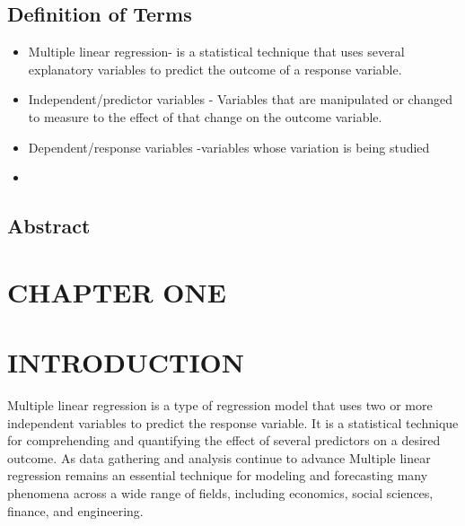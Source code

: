 \documentclass{article}
\numberwithin{equation}{section}
\begin{document}
	\subsection{Definition of Terms}
	\begin{itemize}
		\item  Multiple linear regression- is a statistical technique that uses several explanatory variables to predict the outcome of a response variable.
		\item Independent/predictor variables - Variables that are manipulated or changed to measure to the effect of that change on the outcome variable.
		\item Dependent/response variables -variables whose variation is being studied
		
		\item 
	
	\end{itemize}
	
	\newpage
	\subsection{Abstract}
	
	\clearpage
	
\section*{CHAPTER ONE}
\section*{INTRODUCTION}
\setcounter{section}{1}
\setcounter{subsection}{0}

Multiple linear regression is a type of regression model that uses two or more independent variables to predict the response variable. It is a statistical technique for comprehending and quantifying the effect of several predictors on a desired outcome. As data gathering and analysis continue to advance Multiple linear regression remains an essential technique for modeling and forecasting many phenomena across a wide range of fields, including economics, social sciences, finance, and engineering.
\end{document}
